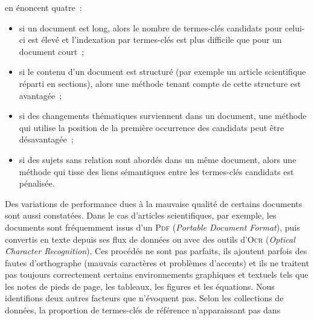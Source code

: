      en énoncent quatre~:
    \begin{itemize}
      \item{si un document est long, alors le nombre de termes-clés candidats
            pour celui-ci est élevé et l'indexation par termes-clés est plus
            difficile que pour un document court~;}
      \item{si le contenu d'un document est structuré (par exemple un article
            scientifique réparti en sections), alors une méthode tenant compte
            de cette structure est avantagée~;}
      \item{si des changements thématiques surviennent dans un document, une
            méthode qui utilise la position de la première occurrence des
            candidats peut être désavantagée~;}
      \item{si des sujets sans relation sont abordés dans un même document,
            alors une méthode qui tisse des liens sémantiques entre les
            termes-clés candidats est pénalisée.}
    \end{itemize}
    Des variations de performance dues à la mauvaise qualité de certains
    documents sont aussi constatées. Dans le cas d'articles scientifiques, par
    exemple, les documents sont fréquemment issus d'un \textsc{Pdf}
    (\textit{Portable Document Format}), puis convertis en texte depuis ses flux
    de données ou avec des outils d'\textsc{Ocr} (\textit{Optical Character
    Recognition}). Ces procédés ne sont pas parfaits, ils ajoutent parfois des
    fautes d'orthographe (mauvais caractères et problèmes d'accents) et ils ne
    traitent pas toujours correctement certains environnements graphiques et
    textuels tels que les notes de pieds de page, les tableaux, les figures et
    les équations. Nous identifions deux autres facteurs que
     n'évoquent pas. Selon les collections de
    données, la proportion de termes-clés de référence n'apparaissant pas dans
